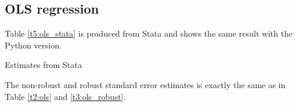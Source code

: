 \documentclass{article}
\begin{document}
\subsection{OLS regression}
Table \ref{t5:ols_stata} is produced from Stata and shows the same result with the Python version.

\begin{table}[H]\centering
\begin{threeparttable}
    \caption{Estimates from Stata}
    \label{t5:ols_stata}
    
    \begin{tablenotes}
    \small \item The non-robust and robust standard error estimates is exactly the same as in Table \ref{t2:ols} and \ref{t3:ols_robust}.
    \end{tablenotes}
\end{threeparttable}
\end{table}
\end{document}
